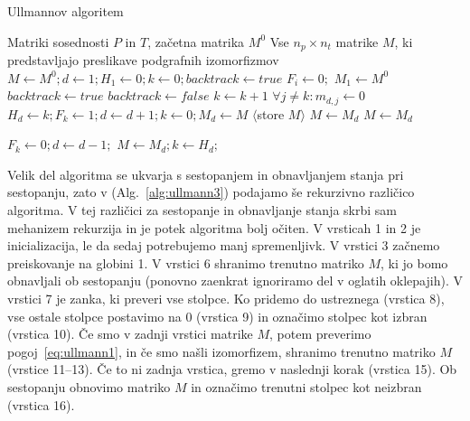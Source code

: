 \documentclass[a4paper, 12pt, ]{book}
\newcommand{\refalg}[1]{(Alg.~\ref{#1})}
\begin{document}
\begin{algorithm}
\caption{Ullmannov algoritem}
\label{alg:ullmann1}
\begin{algorithmic}[1]
	\Require Matriki sosednosti $P$ in $T$, začetna matrika $M^0$
	\Ensure Vse $n_p \times n_t$ matrike $M$, ki predstavljajo preslikave podgrafnih izomorfizmov				
	\State $M \gets M^0; d \gets 1; H_1 \gets 0; k \gets 0; backtrack \gets true$								
	 $F_i \gets 0;$ \EndFor													
	\State $M_1 \gets M^0$																	
		\State $backtrack \gets true$													
			\State $backtrack \gets false$
			\Repeat 
				\State $k \gets k +1$ 															
			\State $\forall j \not = k : m_{d,j} \gets 0$										\label{alg:ullmann1.11}
					\State $H_d \gets k; F_k \gets 1; d \gets d+1; k \gets 0; M_d \gets M$
				\Else																			
						\State $\langle$store $M$$\rangle$
					\EndIf													
						\State $M \gets M_d$		
				\EndIf
			\Else
				\State $M \gets M_d$
			\EndIf
		\EndIf
		
			\State $F_k \gets 0; d \gets d-1;$													
				\State $M \gets M_d; k \gets H_d;$												
			\EndIf
		\EndIf
	\EndWhile
\end{algorithmic}
\end{algorithm}

	Velik del algoritma se ukvarja s sestopanjem in obnavljanjem stanja pri sestopanju, zato v \refalg{alg:ullmann3} podajamo še rekurzivno 
	različico algoritma. V tej različici za sestopanje in obnavljanje stanja skrbi sam mehanizem rekurzija in je potek algoritma bolj očiten. V vrsticah 1 in 2 
	je inicializacija, le da sedaj potrebujemo manj spremenljivk. V vrstici 3 začnemo preiskovanje na globini 1. V vrstici 6 shranimo trenutno matriko $M$,
	ki jo bomo obnavljali ob sestopanju (ponovno zaenkrat ignoriramo del v oglatih oklepajih). V vrstici 7 je zanka, ki preveri vse stolpce. Ko pridemo do
	ustreznega (vrstica 8), vse ostale stolpce postavimo na 0 (vrstica 9) in označimo stolpec kot izbran (vrstica 10). Če smo v zadnji vrstici matrike $M$,
	potem preverimo pogoj~\ref{eq:ullmann1}, in če smo našli izomorfizem, shranimo trenutno matriko $M$ (vrstice 11--13). Če to ni zadnja vrstica, gremo
	v naslednji korak (vrstica 15). Ob sestopanju obnovimo matriko $M$ in označimo trenutni stolpec kot neizbran (vrstica 16).
\end{document}
